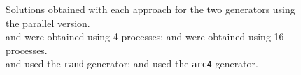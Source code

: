\begin{figure}[!htp]
	\captionsetup[subfloat]{position=bottom}
	\hfill
	\caption[Parallel Solutions]{Solutions obtained with each approach for the two generators using the parallel version.\\ and  were obtained using 4 processes;  and  were obtained using 16 processes.\\ and  used the \texttt{rand} generator;  and  used the \texttt{arc4} generator.}
	\label{fig:mpi}
\end{figure}